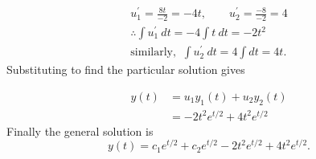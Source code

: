 \documentclass[
	12pt,
	]{article}
\newcommand{\p}{\prime}
\theoremstyle{definition}
\theoremstyle{definition}
\theoremstyle{definition}
\theoremstyle{definition}
\theoremstyle{definition}
\theoremstyle{example}
\theoremstyle{note}
\theoremstyle{remark}
\theoremstyle{example}
\begin{document}
 			 			\begin{gather*}
 			 				u_{1}^{\p} = \frac{8t}{-2} = -4t ,\qquad u_{2}^{\p}=\frac{-8}{-2} =4 \\
 			 				\therefore \int u_{1}^{\p} \ dt = -4 \int t \ dt = -2t^{2}\\
 			 				\text{similarly, }\ \int u_{2}^{\p} \ dt = 4 \int dt = 4t.
 			 			\end{gather*}
 			 			Substituting to find the particular solution gives
 			 			
 			 			\begin{align*}
 			 				y(t) &= u_{1}y_{1}(t) + u_{2}y_{2}(t) \\
 			 				&= -2t^{2}e^{t/2} + 4t^{2}e^{t/2}
 			 			\end{align*}
 			 			Finally the general solution is 
 			 			$$ y(t) = c_{1}e^{t/2} +c_{2}e^{t/2} - 2t^{2}e^{t/2} + 4t^{2}e^{t/2}.$$
\end{document}
